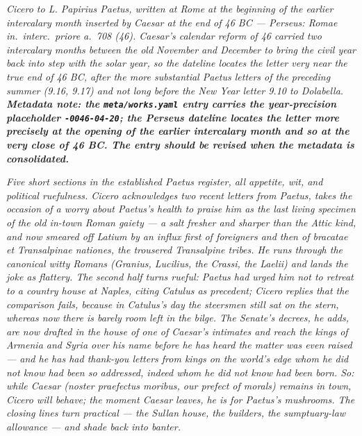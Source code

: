 
\textit{Cicero to L. Papirius Paetus, written at Rome at the beginning
of the earlier intercalary month inserted by Caesar at the end of 46
BC --- Perseus: \textit{Romae in.~interc.~priore a.~708 (46)}.
Caesar's calendar reform of 46 carried two intercalary months between
the old November and December to bring the civil year back into step
with the solar year, so the dateline locates the letter very near the
true end of 46 BC, after the more substantial Paetus letters of the
preceding summer (9.16, 9.17) and not long before the New Year letter
9.10 to Dolabella. \textbf{Metadata note: the \texttt{meta/works.yaml}
entry carries the year-precision placeholder \texttt{-0046-04-20};
the Perseus dateline locates the letter more precisely at the
opening of the earlier intercalary month and so at the very close
of 46 BC. The entry should be revised when the metadata is
consolidated.}}

\textit{Five short sections in the established Paetus register, all
appetite, wit, and political ruefulness. Cicero acknowledges two
recent letters from Paetus, takes the occasion of a worry about
Paetus's health to praise him as the last living specimen of the old
in-town Roman gaiety --- a \textit{salt} fresher and sharper than the
Attic kind, and now smeared off Latium by an influx first of foreigners
and then of \textit{bracatae et Transalpinae nationes}, the trousered
Transalpine tribes. He runs through the canonical witty Romans
(Granius, Lucilius, the Crassi, the Laelii) and lands the joke as
flattery. The second half turns rueful: Paetus had urged him not to
retreat to a country house at Naples, citing Catulus as precedent;
Cicero replies that the comparison fails, because in Catulus's day
the steersmen still sat on the stern, whereas now there is barely
room left in the bilge. The Senate's decrees, he adds, are now
drafted in the house of one of Caesar's intimates and reach the kings
of Armenia and Syria over his name before he has heard the matter was
even raised --- and he has had thank-you letters from kings on the
world's edge whom he did not know had been so addressed, indeed whom
he did not know had been born. So: while Caesar (\textit{noster
praefectus moribus}, our prefect of morals) remains in town, Cicero
will behave; the moment Caesar leaves, he is for Paetus's mushrooms.
The closing lines turn practical --- the Sullan house, the builders,
the sumptuary-law allowance --- and shade back into banter.}
